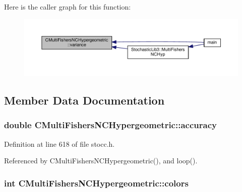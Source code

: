 Here is the caller graph for this function\-:\nopagebreak
\begin{figure}[H]
\begin{center}
\leavevmode
\includegraphics[width=350pt]{class_c_multi_fishers_n_c_hypergeometric_a9bf6de6a8bce7dcb57392e0b33461788_icgraph}
\end{center}
\end{figure}




\subsection{Member Data Documentation}
\subsubsection[{accuracy}]{\setlength{\rightskip}{0pt plus 5cm}double C\-Multi\-Fishers\-N\-C\-Hypergeometric\-::accuracy\hspace{0.3cm}{\ttfamily [protected]}}\label{class_c_multi_fishers_n_c_hypergeometric_ad8db1054fbe362755aa3e556d102786f}


Definition at line 618 of file stocc.\-h.



Referenced by C\-Multi\-Fishers\-N\-C\-Hypergeometric(), and loop().

\subsubsection[{colors}]{\setlength{\rightskip}{0pt plus 5cm}int C\-Multi\-Fishers\-N\-C\-Hypergeometric\-::colors\hspace{0.3cm}{\ttfamily [protected]}}\label{class_c_multi_fishers_n_c_hypergeometric_a19f7ae2ff81fd88efab40e58683778f3}


